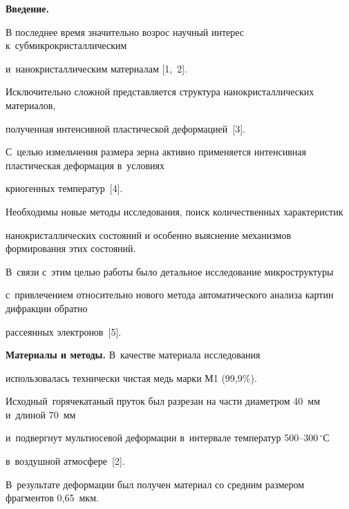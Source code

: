 


\date{02/VI/2009}






\maketitle

\small



\textbf{Введение.}

В последнее время значительно возрос научный интерес к~субмикрокристаллическим

и~нанокристаллическим материалам [1,~2].

Исключительно сложной представляется структура нанокристаллических материалов,

полученная интенсивной пластической деформацией~[3].

С~целью измельчения размера зерна активно применяется интенсивная пластическая деформация в~условиях

криогенных температур~[4].

Необходимы новые методы исследования, поиск количественных характеристик

нанокристаллических состояний и особенно выяснение механизмов формирования этих состояний.

В~связи с~этим целью работы было детальное исследование микроструктуры

с~привлечением относительно нового метода автоматического анализа картин дифракции обратно

рассеянных \mbox{электронов~[5].}



\textbf{Материалы и методы.} В~качестве материала исследования

использовалась технически чистая медь марки М1 (99,9{\%}).

Исходный~горячекатаный пруток был разрезан на части диаметром 40~мм и~длиной 70~мм

и~подвергнут мультиосевой деформации в~интервале температур 500--300\,$^\circ$С

в~воздушной атмосфере~[2].

В~результате деформации был получен материал со средним размером фрагментов 0,65~мкм.

